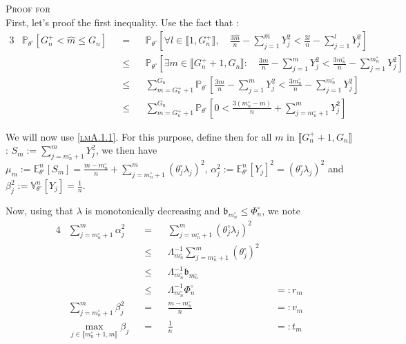 \begin{pro}{\textsc{Proof for } \\}\label{proB.1.2}
First, let's proof the first inequality.
Use the fact that : 
\begin{alignat*}{3}
& \mathds{P}_{\theta^{\circ}}\left[G_{n}^{+} < \widehat{m} \leq G_{n}\right]
&&=&& \mathds{P}_{\theta^{\circ}} \left[\forall l \in \llbracket 1, G_{n}^{+}\rrbracket, \quad \frac{3 \widehat{m}}{n} - \sum\limits_{j=1}^{\widehat{m}} Y_{j}^{2} < \frac{3 l}{n} - \sum\limits_{j=1}^{l} Y_{j}^{2} \right]\\
& &&\leq&& \mathds{P}_{\theta^{\circ}}\left[\exists m \in \llbracket G_{n}^{+} + 1, G_{n}\rrbracket : \quad \frac{3 m}{n} - \sum\limits_{j=1}^{m} Y_{j}^{2} < \frac{3 m_{n}^{\circ}}{n} - \sum\limits_{j=1}^{m_{n}^{\circ}} Y_{j}^{2} \right]\\
& &&\leq&& \sum\limits_{m = G_{n}^{+} + 1}^{G_{n}} \mathds{P}_{\theta^{\circ}}\left[\frac{3 m}{n} - \sum\limits_{j=1}^{m} Y_{j}^{2} < \frac{3 m_{n}^{\circ}}{n} - \sum\limits_{j=1}^{m_{n}^{\circ}} Y_{j}^{2}\right]\\
& &&\leq&& \sum\limits_{m = G_{n}^{+} + 1}^{G_{n}} \mathds{P}_{\theta^{\circ}}\left[0 < \frac{3 \left(m_{n}^{\circ} - m \right)}{n} + \sum\limits_{j = m_{n}^{\circ} + 1}^{m} Y_{j}^{2}\right]
\end{alignat*}

We will now use \textsc{\cref{lmA.1.1}}. For this purpose, define then for all $m$ in $\llbracket G_{n}^{+} + 1, G_{n} \rrbracket$ : $S_{m} := \sum\limits_{j = m_{n}^{\circ} + 1}^{m} Y_{j}^{2}$, we then have $\mu_{m} := \mathds{E}_{\theta^{\circ}}^{n}\left[S_{m}\right] = \frac{m- m_{n}^{\circ}}{n} + \sum\limits_{j = m_{n}^{\circ} + 1}^{m} \left(\theta^{\circ}_{j}\lambda_{j}\right)^{2}$, $\alpha_{j}^{2} := \mathds{E}_{\theta^{\circ}}^{n}\left[Y_{j}\right]^{2} =  \left(\theta^{\circ}_{j}\lambda_{j}\right)^{2}$ and $\beta_{j}^{2} := \mathds{V}_{\theta^{\circ}}^{n}\left[Y_{j}\right] = \frac{1}{n}$.

Now, using that $\lambda$ is monotonically decreasing and $\mathfrak{b}_{m_{n}^{\circ}} \leq \Phi_{n}^{\circ}$, we note
\begin{alignat*}{4}
&\sum\limits_{j = m_{n}^{\circ} + 1}^{m} \alpha_{j}^{2} &&=&& \sum\limits_{j = m_{n}^{\circ} + 1}^{m}\left(\theta^{\circ}_{j}\lambda_{j}\right)^{2} &&\\
& &&\leq&& \Lambda_{m_{n}^{\circ}}^{-1} \sum\limits_{j = m_{n}^{\circ} + 1}^{m}\left(\theta^{\circ}_{j}\right)^{2} &&\\
& &&\leq&& \Lambda_{m_{n}^{\circ}}^{-1} \mathfrak{b}_{m_{n}^{\circ}} &&\\
& &&\leq&& \Lambda_{m_{n}^{\circ}}^{-1} \Phi_{n}^{\circ} &&=: r_{m}\\
&\sum\limits_{j = m_{n}^{\circ} + 1}^{m} \beta_{j}^{2} &&=&& \frac{m - m_{n}^{\circ}}{n} &&=: v_{m}\\
& \max\limits_{j \in \llbracket m_{n}^{\circ} + 1, m \rrbracket} \beta_{j} && = && \frac{1}{n} &&=: t_{m}
\end{alignat*}


\end{pro}

